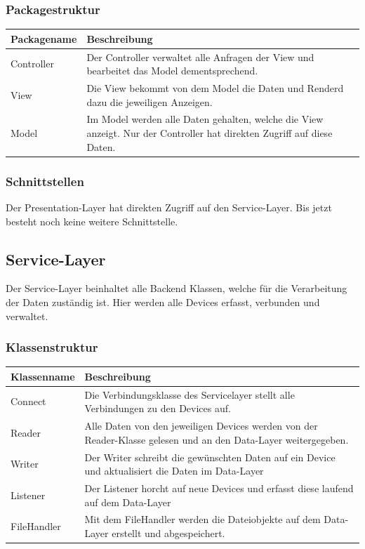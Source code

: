 \subsubsection{Packagestruktur}
\begin{table}[H]
\centering
    \begin{tabular}{@{}l p{14.1cm} @{}}\toprule    
    {Packagename} & {Beschreibung}\\ \midrule
    Controller & Der Controller verwaltet alle Anfragen der View und bearbeitet das Model dementsprechend.\\       
    View & Die View bekommt von dem Model die Daten und Renderd dazu die jeweiligen Anzeigen. \\
    Model & Im Model werden alle Daten gehalten, welche die View anzeigt. Nur der Controller hat direkten Zugriff auf diese Daten. \\
    \bottomrule
    \end{tabular}
\end{table}
\subsubsection{Schnittstellen}
Der Presentation-Layer hat direkten Zugriff auf den Service-Layer. Bis jetzt besteht noch keine weitere Schnittstelle.


\subsection{Service-Layer}
Der Service-Layer beinhaltet alle Backend Klassen, welche für die Verarbeitung der Daten zuständig ist. Hier werden alle Devices erfasst, verbunden und verwaltet.
\subsubsection{Klassenstruktur}
\begin{table}[H]
\centering
    \begin{tabular}{@{}l p{14.1cm} @{}}\toprule    
    {Klassenname} & {Beschreibung}\\ \midrule
    Connect & Die Verbindungsklasse des Servicelayer stellt alle Verbindungen zu den Devices auf.  \\       
     Reader & Alle Daten von den jeweiligen Devices werden von der Reader-Klasse gelesen und an den Data-Layer weitergegeben.  \\       
     Writer &  Der Writer schreibt die gewünschten Daten auf ein Device und aktualisiert die Daten im Data-Layer \\       
     Listener &  Der Listener horcht auf neue Devices und erfasst diese laufend auf dem Data-Layer \\       
     FileHandler &  Mit dem FileHandler werden die Dateiobjekte auf dem Data-Layer erstellt und abgespeichert. \\       
    \bottomrule
    \end{tabular}
\end{table}
